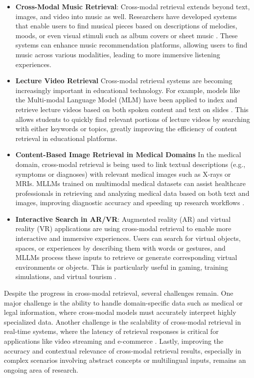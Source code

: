 \documentclass{article}
\begin{document}
\begin{itemize}
\item \textbf{Cross-Modal Music Retrieval}: Cross-modal retrieval extends beyond text, images, and video into music as well. Researchers have developed systems that enable users to find musical pieces based on descriptions of melodies, moods, or even visual stimuli such as album covers or sheet music \cite{vs2019muller}. These systems can enhance music recommendation platforms, allowing users to find music across various modalities, leading to more immersive listening experiences.

\item \textbf{Lecture Video Retrieval} Cross-modal retrieval systems are becoming increasingly important in educational technology. For example, models like the Multi-modal Language Model (MLM) have been applied to index and retrieve lecture videos based on both spoken content and text on slides \cite{vs2014chen}. This allows students to quickly find relevant portions of lecture videos by searching with either keywords or topics, greatly improving the efficiency of content retrieval in educational platforms.

\item \textbf{Content-Based Image Retrieval in Medical Domains} In the medical domain, cross-modal retrieval is being used to link textual descriptions (e.g., symptoms or diagnoses) with relevant medical images such as X-rays or MRIs. MLLMs trained on multimodal medical datasets can assist healthcare professionals in retrieving and analyzing medical data based on both text and images, improving diagnostic accuracy and speeding up research workflows \cite{vs2024jiang,vs2018dorfer}.

\item \textbf{Interactive Search in AR/VR}: Augmented reality (AR) and virtual reality (VR) applications are using cross-modal retrieval to enable more interactive and immersive experiences. Users can search for virtual objects, spaces, or experiences by describing them with words or gestures, and MLLMs process these inputs to retrieve or generate corresponding virtual environments or objects. This is particularly useful in gaming, training simulations, and virtual tourism \cite{vs2024li}.

\end{itemize}

Despite the progress in cross-modal retrieval, several challenges remain. One major challenge is the ability to handle domain-specific data such as medical or legal information, where cross-modal models must accurately interpret highly specialized data. Another challenge is the scalability of cross-modal retrieval in real-time systems, where the latency of retrieval responses is critical for applications like video streaming and e-commerce \cite{vs2024chang,vs2024gomez}. Lastly, improving the accuracy and contextual relevance of cross-modal retrieval results, especially in complex scenarios involving abstract concepts or multilingual inputs, remains an ongoing area of research.
\end{document}
